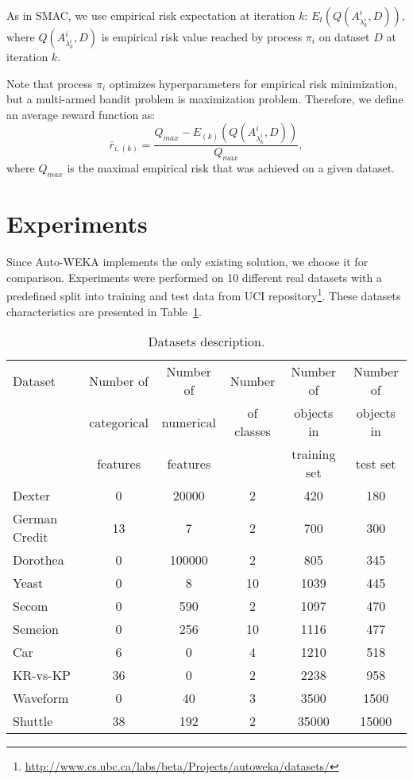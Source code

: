\documentclass{svproc}
\begin{document}
As in SMAC, we use empirical risk expectation at iteration $k$: $E_t(Q(A^i_{\lambda^i_k}, D))$, where $Q(A^i_{\lambda^i_k}, D)$ is empirical risk value reached by process $\pi_i$ on dataset $D$ at iteration $k$.

Note that process $\pi_i$ optimizes hyperparameters for empirical risk minimization, but a multi-armed bandit problem is maximization problem. Therefore, we define an average reward function as:  
\[
\bar r_{i, (k)} = \frac {Q_{max} - E_{(k)}(Q(A^i_{\lambda^i_k}, D))} {Q_{max}},
\]
where $Q_{max}$ is the maximal empirical risk that was achieved on a given dataset.


\section{Experiments}
\label{sec:experiment}

Since Auto-WEKA implements the only existing solution, we choose it for comparison. Experiments were performed on 10 different real datasets with a predefined split into training and test data from UCI repository\footnote{\url{http://www.cs.ubc.ca/labs/beta/Projects/autoweka/datasets/}}. These datasets characteristics are presented in Table~\ref{tab:dat}.

\begin{table}[t]
\caption{Datasets description.}\label{tab:dat}
\begin{center}
\begin{tabular}{|l|c|c|c|c|c|}
\hline
Dataset & Number of        & Number of    &  Number    & Number of       &  Number of \\  
        & categorical      & numerical    & of classes & objects in      &  objects in  \\
        & features         & features     &            & training set    &  test set  \\
\hline
Dexter & 0 & 20000 & 2 & 420 & 180 \\
\hline
German Credit & 13 & 7 & 2 & 700 & 300 \\
\hline
Dorothea & 0 & 100000 & 2 & 805 & 345 \\
\hline
Yeast & 0 & 8 & 10 & 1039 & 445 \\
\hline
Secom & 0 & 590 & 2 & 1097 & 470 \\
\hline
Semeion & 0 & 256 & 10 & 1116 & 477 \\ 
\hline
Car & 6 & 0 & 4 & 1210 & 518 \\
\hline
KR-vs-KP & 36 & 0 & 2 & 2238 & 958 \\
\hline
Waveform & 0 & 40 & 3 & 3500 & 1500 \\
\hline
Shuttle & 38 & 192 & 2 & 35000 & 15000 \\
\hline
\end{tabular}
\end{center}
\end{table}
\end{document}
